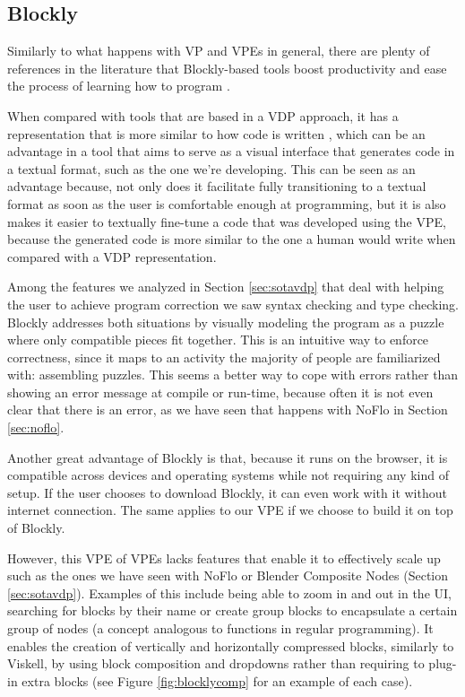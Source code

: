 \subsection{Blockly}
\label{sec:fblock}

Similarly to what happens with VP and VPEs in general, there are plenty of references
in the literature that Blockly-based tools boost productivity \cite{Marron2012} and ease the process
of learning how to program \cite{Junior2006}.

When compared with tools that are
based in a VDP approach, it has a representation that is more similar to how code
is written \cite{blockly}, which can be an advantage in a tool that aims to serve as a visual
interface that generates code in a textual format, such as the one we're developing.
This can be seen as an advantage because, not only does it facilitate fully transitioning
to a textual format as soon as the user is comfortable enough at programming,
but it is also makes it easier to textually fine-tune a code that was developed
using the VPE, because the generated code is more similar to the one a human
would write when compared with a VDP representation.

Among the features we analyzed in Section \ref{sec:sotavdp} that deal with
helping the user to achieve program correction we saw syntax checking and type
checking. Blockly addresses both situations by visually modeling the program
as a puzzle where only compatible pieces fit together. This is an intuitive way
to enforce correctness, since it maps to an activity the majority of people are
familiarized with: assembling puzzles. This seems a better way to cope with errors
rather than showing an error message at compile or run-time, because often it is
not even clear that there is an error, as we have seen that happens with NoFlo in
Section \ref{sec:noflo}.

Another great advantage of Blockly is that, because it runs on the browser, it is
compatible across devices and operating systems while not requiring any kind of setup.
If the user chooses to download Blockly, it can even work with it without internet
connection. The same applies to our VPE if we choose to build it on top of Blockly.

However, this VPE of VPEs lacks features that enable it to effectively scale up
such as the ones we have seen with NoFlo or Blender Composite Nodes (Section \ref{sec:sotavdp}).
Examples of this include being able to zoom in and out in the UI, searching for
blocks by their name or create group blocks to encapsulate a certain group of
nodes (a concept analogous to functions in regular programming). It enables the
creation of vertically and horizontally compressed blocks, similarly to Viskell,
by using block composition and dropdowns rather than requiring to plug-in extra blocks
(see Figure \ref{fig:blocklycomp} for an example of each case).

